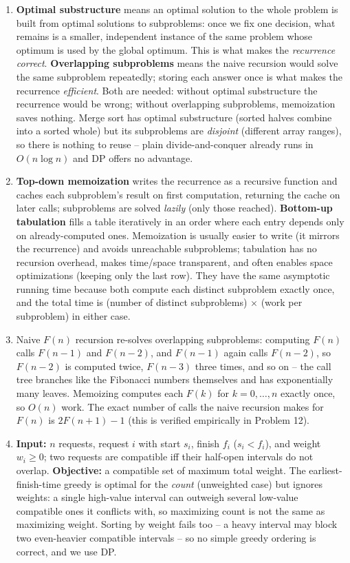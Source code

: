 \documentclass[11pt]{article}
\begin{document}
\begin{enumerate}[label=\textbf{A\arabic*.}, leftmargin=2.2em]

\item \textbf{Optimal substructure} means an optimal solution to the whole problem is built
from optimal solutions to subproblems: once we fix one decision, what remains is a smaller,
independent instance of the same problem whose optimum is used by the global optimum. This
is what makes the \emph{recurrence correct}. \textbf{Overlapping subproblems} means the
naive recursion would solve the same subproblem repeatedly; storing each answer once is
what makes the recurrence \emph{efficient}. Both are needed: without optimal substructure
the recurrence would be wrong; without overlapping subproblems, memoization saves nothing.
Merge sort has optimal substructure (sorted halves combine into a sorted whole) but its
subproblems are \emph{disjoint} (different array ranges), so there is nothing to reuse --
plain divide-and-conquer already runs in $O(n \log n)$ and DP offers no advantage.

\item \textbf{Top-down memoization} writes the recurrence as a recursive function and
caches each subproblem's result on first computation, returning the cache on later calls;
subproblems are solved \emph{lazily} (only those reached). \textbf{Bottom-up tabulation}
fills a table iteratively in an order where each entry depends only on already-computed
ones. Memoization is usually easier to write (it mirrors the recurrence) and avoids
unreachable subproblems; tabulation has no recursion overhead, makes time/space transparent,
and often enables space optimizations (keeping only the last row). They have the same
asymptotic running time because both compute each distinct subproblem exactly once, and the
total time is (number of distinct subproblems) $\times$ (work per subproblem) in either
case.

\item Naive $F(n)$ recursion re-solves overlapping subproblems: computing $F(n)$ calls
$F(n-1)$ and $F(n-2)$, and $F(n-1)$ again calls $F(n-2)$, so $F(n-2)$ is computed twice,
$F(n-3)$ three times, and so on -- the call tree branches like the Fibonacci numbers
themselves and has exponentially many leaves. Memoizing computes each $F(k)$ for $k =
0,\ldots,n$ exactly once, so $O(n)$ work. The exact number of calls the naive recursion
makes for $F(n)$ is $2F(n+1) - 1$ (this is verified empirically in Problem 12).

\item \textbf{Input:} $n$ requests, request $i$ with start $s_i$, finish $f_i$ ($s_i <
f_i$), and weight $w_i \ge 0$; two requests are compatible iff their half-open intervals do
not overlap. \textbf{Objective:} a compatible set of maximum total weight. The
earliest-finish-time greedy is optimal for the \emph{count} (unweighted case) but ignores
weights: a single high-value interval can outweigh several low-value compatible ones it
conflicts with, so maximizing count is not the same as maximizing weight. Sorting by weight
fails too -- a heavy interval may block two even-heavier compatible intervals -- so no
simple greedy ordering is correct, and we use DP.


\end{enumerate}
\end{document}
